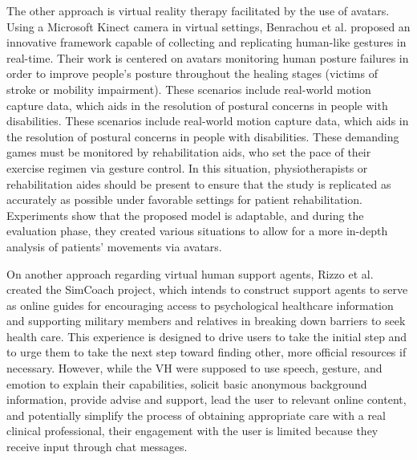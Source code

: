 The other approach is virtual reality therapy facilitated by the use of avatars. Using a Microsoft Kinect camera in virtual settings, Benrachou et al. \cite{BEN20} proposed an innovative framework capable of collecting and replicating human-like gestures in real-time. Their work is centered on avatars monitoring human posture failures in order to improve people's posture throughout the healing stages (victims of stroke or mobility impairment). These scenarios include real-world motion capture data, which aids in the resolution of postural concerns in people with disabilities. These scenarios include real-world motion capture data, which aids in the resolution of postural concerns in people with disabilities. These demanding games must be monitored by rehabilitation aids, who set the pace of their exercise regimen via gesture control. In this situation, physiotherapists or rehabilitation aides should be present to ensure that the study is replicated as accurately as possible under favorable settings for patient rehabilitation. Experiments show that the proposed model is adaptable, and during the evaluation phase, they created various situations to allow for a more in-depth analysis of patients' movements via avatars.

On another approach regarding virtual human support agents, Rizzo et al. \cite{RIZ11} created the SimCoach project, which intends to construct support agents to serve as online guides for encouraging access to psychological healthcare information and supporting military members and relatives in breaking down barriers to seek health care. This experience is designed to drive users to take the initial step and to urge them to take the next step toward finding other, more official resources if necessary. However, while the VH were supposed to use speech, gesture, and emotion to explain their capabilities, solicit basic anonymous background information, provide advise and support, lead the user to relevant online content, and potentially simplify the process of obtaining appropriate care with a real clinical professional, their engagement with the user is limited because they receive input through chat messages.

